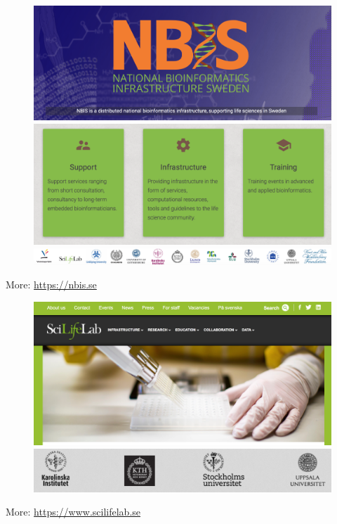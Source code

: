 \documentclass{beamer}\usepackage[]{graphicx}\usepackage[]{color}
\begin{document}
\begin{frame}
\begin{figure}
   \includegraphics[scale=0.2]{../figures/lecture-welcome/NBIS-main.png}
   \hfill
   \vspace{5mm}
   \includegraphics[scale=0.3]{../figures/lecture-welcome/NBIS-3.png}
   \vspace{5mm}
   \includegraphics[scale=0.3]{../figures/lecture-welcome/NBIS-logos.png}
\end{figure}
\small
More: \hyperlink{https://nbis.se}{https://nbis.se}
\end{frame}


\begin{frame}
\begin{figure}
   \includegraphics[scale=0.3]{../figures/lecture-welcome/SciLifeLab-main.png}
   \hfill
   \vspace{5mm}
   \includegraphics[scale=0.3]{../figures/lecture-welcome/SciLifeLab-logos.png}
\end{figure}
\small
More: \hyperlink{https://www.scilifelab.se}{https://www.scilifelab.se}
\end{frame}
\end{document}
